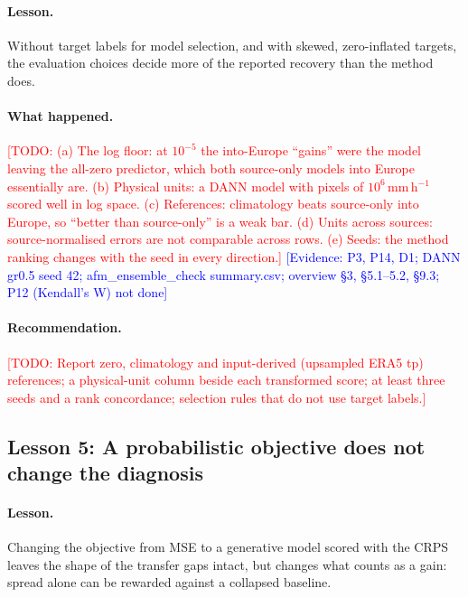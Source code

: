 \documentclass{ametsocV6.2}
\newcommand{\todo}[1]{\textcolor{red}{[TODO: #1]}}
\newcommand{\ev}[1]{\textcolor{blue}{[Evidence: #1]}}
\begin{document}
\paragraph{Lesson.} Without target labels for model selection, and with
skewed, zero-inflated targets, the evaluation choices decide more of the
reported recovery than the method does.

\paragraph{What happened.} \todo{(a) The log floor: at $10^{-5}$ the
into-Europe ``gains'' were the model leaving the all-zero predictor, which
both source-only models into Europe essentially are. (b) Physical units:
a DANN model with pixels of $10^{6}$\,mm\,h$^{-1}$ scored well in log
space. (c) References: climatology beats source-only into Europe, so
``better than source-only'' is a weak bar. (d) Units across sources:
source-normalised errors are not comparable across rows. (e) Seeds: the
method ranking changes with the seed in every direction.}
\ev{P3, P14, D1; DANN gr0.5 seed 42; afm\_ensemble\_check summary.csv;
overview \S3, \S5.1--5.2, \S9.3; P12 (Kendall's W) not done}

\paragraph{Recommendation.} \todo{Report zero, climatology and
input-derived (upsampled ERA5 tp) references; a physical-unit column
beside each transformed score; at least three seeds and a rank
concordance; selection rules that do not use target labels.}


\subsection{Lesson 5: A probabilistic objective does not change the
diagnosis}\label{sec:L5}

\paragraph{Lesson.} Changing the objective from MSE to a generative model
scored with the CRPS leaves the shape of the transfer gaps intact, but
changes what counts as a gain: spread alone can be rewarded against a
collapsed baseline.
\end{document}

